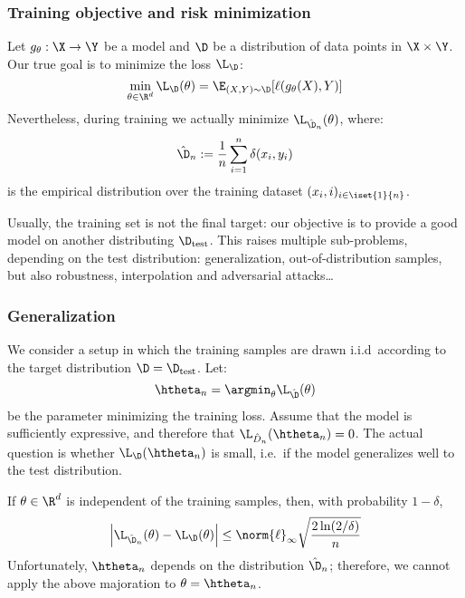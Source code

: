 \subsubsection{Training objective and risk minimization}
Let $g_\theta:\X\to\Y$ be a model and $\D$ be a distribution of data points in $\X\times\Y$. Our true goal is to minimize the loss $\L_\D$:
\begin{equation*}
    \min_{\theta\in\R^d}\L_\D(\theta) = \E_{(X,Y)\sim\D}[\ell(g_\theta(X),Y)]
\end{equation*}
Nevertheless, during training we actually minimize $\L_{\hat{\D}_n}(\theta)$, where:
\begin{equation*}
    \hat{\D}_n := \frac{1}{n}\sum_{i=1}^n\delta(x_i, y_i)
\end{equation*}
is the empirical distribution over the training dataset $(x_i,i)_{i\in\iset{1}{n}}$.

Usually, the training set is not the final target: our objective is to provide a good model on another distributing $\D_{\textnormal{test}}$. This raises multiple sub-problems, depending on the test distribution: generalization, out-of-distribution samples, but also robustness, interpolation and adversarial attacks\dots

\subsubsection{Generalization}
We consider a setup in which the training samples are drawn i.i.d~according to the target distribution $\D=\D_{\textnormal{test}}$. Let:
\begin{equation*}
    \htheta_n = \argmin_\theta\L_{\hat{\D}}(\theta)
\end{equation*}
be the parameter minimizing the training loss. Assume that the model is sufficiently expressive, and therefore that $\L_{\hat{D}_n}(\htheta_n)=0$. The actual question is whether $\L_{\D}(\htheta_n)$ is small, i.e.~if the model generalizes well to the test distribution.

If $\theta\in\R^d$ is independent of the training samples, then, with probability $1-\delta$,
\begin{equation*}
    \left|\L_{\hat{\D}_n}(\theta)-\L_{\D}(\theta)\right| \leq \norm{\ell}_\infty \sqrt{\frac{2\ln(2/\delta)}{n}}
\end{equation*}
Unfortunately, $\htheta_n$ depends on the distribution $\hat{\D}_n$; therefore, we cannot apply the above majoration to $\theta=\htheta_n$.

